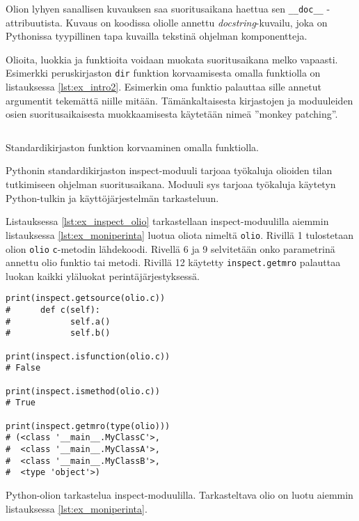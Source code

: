 \documentclass[finnish]{tktltiki2}
\theoremstyle{definition}
\theoremstyle{remark}
\begin{document}
Olion lyhyen sanallisen kuvauksen saa suoritusaikana haettua sen \verb|__doc__| -attribuutista. Kuvaus on koodissa oliolle annettu \emph{docstring}-kuvailu, joka on Pythonissa tyypillinen tapa kuvailla tekstinä ohjelman komponentteja.

Olioita, luokkia ja funktioita voidaan muokata suoritusaikana melko vapaasti. Esimerkki peruskirjaston \verb|dir| funktion korvaamisesta omalla funktiolla on listauksessa \ref{lst:ex_intro2}. Esimerkin oma funktio palauttaa sille annetut argumentit tekemättä niille mitään. Tämänkaltaisesta kirjastojen ja moduuleiden osien suoritusaikaisesta muokkaamisesta käytetään nimeä ''monkey patching''.

\begin{listing}
    \inputminted[linenos,frame=single,framesep=10pt]{python}{code/introspektio2.py}
    \caption{Standardikirjaston funktion korvaaminen omalla funktiolla.}
    \label{lst:ex_intro2}
\end{listing}

Pythonin standardikirjaston inspect-moduuli tarjoaa työkaluja olioiden tilan tutkimiseen ohjelman suoritusaikana. Moduuli sys tarjoaa työkaluja käytetyn Python-tulkin ja käyttöjärjestelmän tarkasteluun.

Listauksessa \ref{lst:ex_inspect_olio} tarkastellaan inspect-moduulilla aiemmin listauksessa \ref{lst:ex_moniperinta} luotua oliota nimeltä \verb|olio|. Rivillä 1 tulostetaan olion \verb|olio| \verb|c|-metodin lähdekoodi. Rivellä 6 ja 9 selvitetään onko parametrinä annettu olio funktio tai metodi. Rivillä 12 käytetty \verb|inspect.getmro| palauttaa luokan kaikki yläluokat perintäjärjestyksessä.

\begin{listing}
\begin{verbatim}
print(inspect.getsource(olio.c))
#      def c(self):
#            self.a()
#            self.b()

print(inspect.isfunction(olio.c))
# False

print(inspect.ismethod(olio.c))
# True

print(inspect.getmro(type(olio)))
# (<class '__main__.MyClassC'>,
#  <class '__main__.MyClassA'>,
#  <class '__main__.MyClassB'>,
#  <type 'object'>)

\end{verbatim}
    \caption{Python-olion tarkastelua inspect-moduulilla. Tarkasteltava olio on luotu aiemmin listauksessa \ref{lst:ex_moniperinta}.}
    \label{lst:ex_inspect_olio}
\end{listing}
\end{document}
